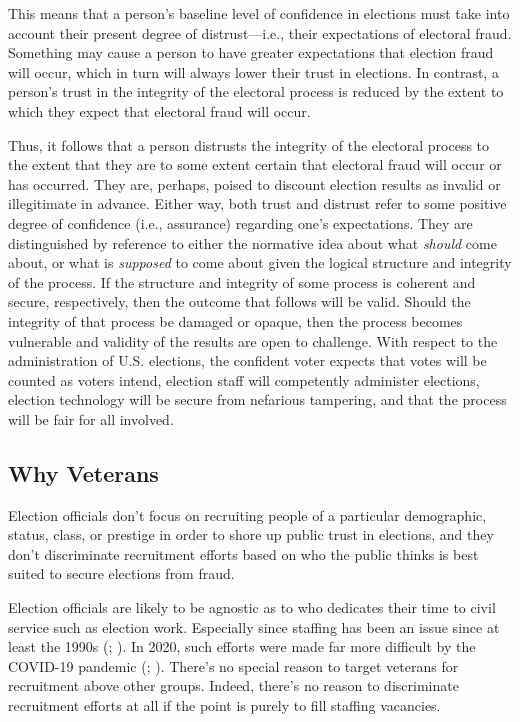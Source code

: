 \documentclass[
  12pt,
  letterpaper,
]{article}
\begin{document}
This means that a person's baseline level of confidence in elections
must take into account their present degree of distrust---i.e., their
expectations of electoral fraud. Something may cause a person to have
greater expectations that election fraud will occur, which in turn will
always lower their trust in elections. In contrast, a person's trust in
the integrity of the electoral process is reduced by the extent to which
they expect that electoral fraud will occur.

Thus, it follows that a person distrusts the integrity of the electoral
process to the extent that they are to some extent certain that
electoral fraud will occur or has occurred. They are, perhaps, poised to
discount election results as invalid or illegitimate in advance. Either
way, both trust and distrust refer to some positive degree of confidence
(i.e., assurance) regarding one's expectations. They are distinguished
by reference to either the normative idea about what \emph{should} come
about, or what is \emph{supposed} to come about given the logical
structure and integrity of the process. If the structure and integrity
of some process is coherent and secure, respectively, then the outcome
that follows will be valid. Should the integrity of that process be
damaged or opaque, then the process becomes vulnerable and validity of
the results are open to challenge. With respect to the administration of
U.S. elections, the confident voter expects that votes will be counted
as voters intend, election staff will competently administer elections,
election technology will be secure from nefarious tampering, and that
the process will be fair for all involved.

\subsection{Why Veterans}\label{why-veterans}

Election officials don't focus on recruiting people of a particular
demographic, status, class, or prestige in order to shore up public
trust in elections, and they don't discriminate recruitment efforts
based on who the public thinks is best suited to secure elections from
fraud.

Election officials are likely to be agnostic as to who dedicates their
time to civil service such as election work. Especially since staffing
has been an issue since at least the 1990s
(;
). In 2020, such efforts
were made far more difficult by the COVID-19 pandemic
(; ). There's no special reason to target veterans for recruitment
above other groups. Indeed, there's no reason to discriminate
recruitment efforts at all if the point is purely to fill staffing
vacancies.
\end{document}
